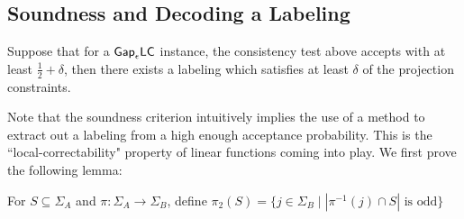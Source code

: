 \subsection{Soundness and Decoding a Labeling}

\begin{proposition}
  Suppose that for a $\mathsf{Gap}_\epsilon\mathsf{LC}$ instance, the consistency test above accepts with at least $\frac{1}{2} + \delta$,  then there exists a labeling which satisfies at least $\delta$ of the projection constraints.
\end{proposition}
Note that the soundness criterion intuitively implies the use of a method to extract out a labeling from a high enough acceptance probability. This is the ``local-correctability" property of linear functions coming into play. We first prove the following lemma:

\begin{definition}
  For $S \subseteq \Sigma_A$ and $\pi:\Sigma_A \rightarrow \Sigma_B$, define $\pi_2(S) = \{j \in \Sigma_B \mid |\pi^{-1}(j) \cap S| \text{ is odd}\}$
\end{definition}

